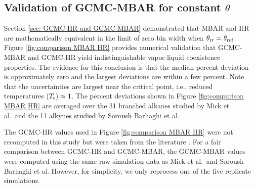 \documentclass[journal=jced,manuscript=article]{achemso}
\begin{document}

\subsection{Validation of GCMC-MBAR for constant $\theta$} \label{sec: Constant theta} 

Section \ref{sec: GCMC-HR and GCMC-MBAR} demonstrated that MBAR and HR are mathematically equivalent in the limit of zero bin width when $\theta_{\rm rr} = \theta_{\rm ref}$. Figure \ref{fig:comparison MBAR HR} provides numerical validation that GCMC-MBAR and GCMC-HR yield indistinguishable vapor-liquid coexistence properties. The evidence for this conclusion is that the median percent deviation is approximately zero and the largest deviations are within a few percent. Note that the uncertainties are largest near the critical point, i.e., reduced temperatures $(T_{\rm r}) \approx 1$. The percent deviations shown in Figure \ref{fig:comparison MBAR HR} are averaged over the 31 branched alkanes studied by Mick et al.~and the 11 alkynes studied by Soroush Barhaghi et al. 

The GCMC-HR values used in Figure \ref{fig:comparison MBAR HR} were not recomputed in this study but were taken from the literature \cite{Potoff_branched,Barhaghi2017}. For a fair comparison between GCMC-HR and GCMC-MBAR, the GCMC-MBAR values were computed using the same raw simulation data as Mick et al.~and Soroush Barhaghi et al. However, for simplicity, we only reprocess one of the five replicate simulations. 

\end{document}
